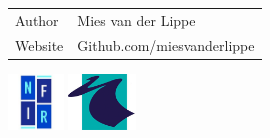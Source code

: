 \begin{titlepage}

\stylizedtitle
\stylizedauthor
\titlepageversion

\vfill

\begin{tabular}{ll}
	Author & Mies van der Lippe \\[2ex]
	Website & Github.com/miesvanderlippe \\[2ex]
\end{tabular}

\vspace{15mm}

\includegraphics[height=1.5cm]{img/nfir.jpg}
\hfill
\includegraphics[height=1.5cm]{img/hsl.png}	

\end{titlepage}